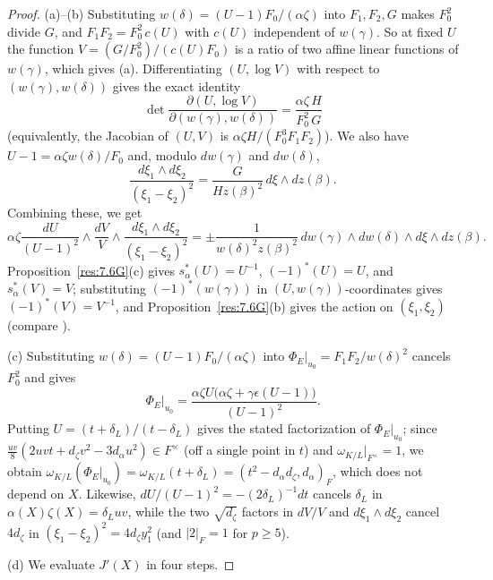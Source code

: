 \documentclass[12pt,letterpaper]{amsart}
\theoremstyle{plain}
\theoremstyle{definition}
\theoremstyle{remark}
\theoremstyle{definition}
\begin{document}
\begin{proof}
(a)--(b) Substituting $w(\delta)=(U-1)F_0/(\alpha\zeta)$ into $F_1,F_2,G$ makes
$F_0^2$ divide $G$, and $F_1F_2=F_0^2\,c(U)$ with $c(U)$ independent of
$w(\gamma)$. So at fixed $U$ the function $V=(G/F_0^2)/(c(U)F_0)$ is a ratio of
two affine linear functions of $w(\gamma)$, which gives (a). Differentiating
$(U,\log V)$ with respect to $(w(\gamma),w(\delta))$ gives the exact identity
\[
\det\frac{\partial(U,\log V)}{\partial(w(\gamma),w(\delta))}
=\frac{\alpha\zeta\,H}{F_0^2\,G}
\]
(equivalently, the Jacobian of $(U,V)$ is
$\alpha\zeta H/(F_0^3F_1F_2)$). We also have $U-1=\alpha\zeta w(\delta)/F_0$ and,
modulo $dw(\gamma)$ and $dw(\delta)$,
\[
\frac{d\xi_1\wedge d\xi_2}{(\xi_1-\xi_2)^2}=\frac{G}{Hz(\beta)^2}\,d\xi\wedge dz(\beta).
\]
Combining these, we get
\[
\alpha\zeta\frac{dU}{(U-1)^2}\wedge\frac{dV}{V}\wedge\frac{d\xi_1\wedge d\xi_2}{(\xi_1-\xi_2)^2}
=\pm\frac{1}{w(\delta)^2z(\beta)^2}\,dw(\gamma)\wedge dw(\delta)\wedge d\xi\wedge dz(\beta).
\]
Proposition~\ref{res:7.6G}(c) gives $s_\alpha^*(U)=U^{-1}$, $(-1)^*(U)=U$, and
$s_\alpha^*(V)=V$; substituting $(-1)^*(w(\gamma))$ in $(U,w(\gamma))$-coordinates
gives $(-1)^*(V)=V^{-1}$, and Proposition~\ref{res:7.6G}(b) gives the action on
$(\xi_1,\xi_2)$ (compare \cite[Eqs.~(6.7)--(6.9), p.~242]{Ha89}).

(c) Substituting $w(\delta)=(U-1)F_0/(\alpha\zeta)$ into
$\Phi_E|_{u_0}=F_1F_2/w(\delta)^2$ cancels $F_0^2$ and gives
\[
\Phi_E|_{u_0}=\frac{\alpha\zeta U\bigl(\alpha\zeta+\gamma\epsilon(U-1)\bigr)}{(U-1)^2}.
\]
Putting
$U=(t+\delta_L)/(t-\delta_L)$ gives the stated factorization of $\Phi_E|_{u_0}$;
since $\frac{uv}{8}(2uvt+d_\zeta v^2-3d_\alpha u^2)\in F^\times$ (off a single
point in $t$) and $\omega_{K/L}|_{F^\times}=1$, we obtain
$\omega_{K/L}(\Phi_E|_{u_0})=\omega_{K/L}(t+\delta_L)=(t^2-d_\alpha d_\zeta,d_\alpha)_F$,
which does not depend on $X$. Likewise, $dU/(U-1)^2=-(2\delta_L)^{-1}dt$ cancels
$\delta_L$ in $\alpha(X)\zeta(X)=\delta_L uv$, while the two $\sqrt{d_\zeta}$
factors in $dV/V$ and $d\xi_1\wedge d\xi_2$ cancel $4d_\zeta$ in
$(\xi_1-\xi_2)^2=4d_\zeta y_1^2$ (and $|2|_F=1$ for $p\ge 5$).

(d) We evaluate $J'(X)$ in four steps.


\end{proof}
\end{document}
